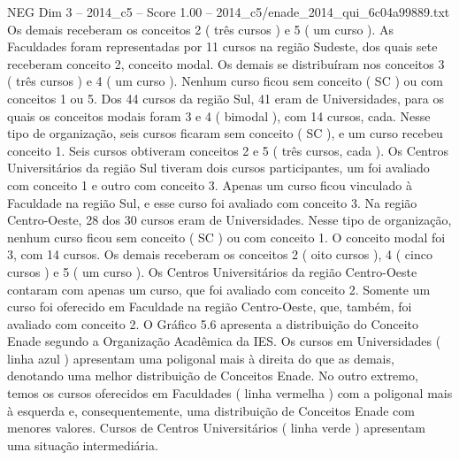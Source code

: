 \begin{textsample}{NEG Dim 3 – 2014\_c5 – Score 1.00 – 2014\_c5/enade\_2014\_qui\_6c04a99889.txt}
Os demais receberam os conceitos 2 ( três cursos ) e 5 ( um curso ).
As Faculdades foram representadas por 11 cursos na região Sudeste, dos quais sete receberam conceito 2, conceito modal.
Os demais se distribuíram nos conceitos 3 ( três cursos ) e 4 ( um curso ).
Nenhum curso ficou sem conceito ( SC ) ou com conceitos 1 ou 5.
Dos 44 cursos da região Sul, 41 eram de Universidades, para os quais os conceitos modais foram 3 e 4 ( bimodal ), com 14 cursos, cada.
Nesse tipo de organização, seis cursos ficaram sem conceito ( SC ), e um curso recebeu conceito 1.
Seis cursos obtiveram conceitos 2 e 5 ( três cursos, cada ).
Os Centros Universitários da região Sul tiveram dois cursos participantes, um foi avaliado com conceito 1 e outro com conceito 3.
Apenas um curso ficou vinculado à Faculdade na região Sul, e esse curso foi avaliado com conceito 3.
Na região Centro-Oeste, 28 dos 30 cursos eram de Universidades.
Nesse tipo de organização, nenhum curso ficou sem conceito ( SC ) ou com conceito 1.
O conceito modal foi 3, com 14 cursos.
Os demais receberam os conceitos 2 ( oito cursos ), 4 ( cinco cursos ) e 5 ( um curso ).
Os Centros Universitários da região Centro-Oeste contaram com apenas um curso, que foi avaliado com conceito 2.
Somente um curso foi oferecido em Faculdade na região Centro-Oeste, que, também, foi avaliado com conceito 2.
O Gráfico 5.6 apresenta a distribuição do Conceito Enade segundo a Organização Acadêmica da IES.
Os cursos em Universidades ( linha azul ) apresentam uma poligonal mais à direita do que as demais, denotando uma melhor distribuição de Conceitos Enade.
No outro extremo, temos os cursos oferecidos em Faculdades ( linha vermelha ) com a poligonal mais à esquerda e, consequentemente, uma distribuição de Conceitos Enade com menores valores.
Cursos de Centros Universitários ( linha verde ) apresentam uma situação intermediária.

\end{textsample}
